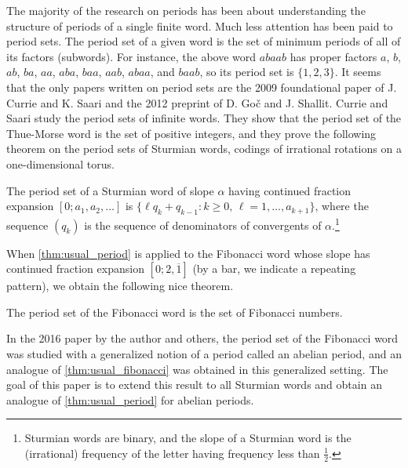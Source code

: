 \documentclass[a4paper,fleqn]{article}
\begin{document}
  The majority of the research on periods has been about understanding the structure of periods of a single finite
  word. Much less attention has been paid to period sets. The period set of a given word is the set of minimum periods
  of all of its factors (subwords). For instance, the above word $abaab$ has proper factors $a$, $b$, $ab$, $ba$, $aa$,
  $aba$, $baa$, $aab$, $abaa$, and $baab$, so its period set is $\{1, 2, 3\}$. It seems that the only papers written on
  period sets are the 2009 foundational paper \cite{2009:least_periods_of_factors_of_infinite_words} of J. Currie and
  K. Saari and the 2012 preprint \cite{2012:least_periods_of_k-automatic_sequences} of D. Go{\v c} and J. Shallit.
  Currie and Saari study the period sets of infinite words. They show that the period set of the Thue-Morse word
  \cite{1999:the_ubiquitous_prouhet-thue-morse_sequence} is the set of positive integers, and they prove the following
  theorem on the period sets of Sturmian words, codings of irrational rotations on a one-dimensional torus.

  \begin{theorem}\label{thm:usual_period}\cite[Cor.~3]{2009:least_periods_of_factors_of_infinite_words}
    The period set of a Sturmian word of slope $\alpha$ having continued fraction expansion $[0; a_1, a_2, \ldots]$ is
    $\{\ell q_k + q_{k-1} : \text{$k \geq 0$, $\ell = 1, \ldots, a_{k+1}$}\}$, where the sequence $(q_k)$ is the
    sequence of denominators of convergents of $\alpha$.\footnote{Sturmian words are binary, and the slope of a Sturmian word is the (irrational) frequency of the letter having frequency less than $\tfrac12$.}
  \end{theorem}

  When \autoref{thm:usual_period} is applied to the Fibonacci word whose slope has continued fraction expansion
  $[0; 2, \overline{1}]$ (by a bar, we indicate a repeating pattern), we obtain the following nice theorem.

  \begin{theorem}\label{thm:usual_fibonacci}\cite[Cor.~4]{2009:least_periods_of_factors_of_infinite_words}
    The period set of the Fibonacci word is the set of Fibonacci numbers.
  \end{theorem}

  In the 2016 paper \cite{2016:abelian_powers_and_repetitions_in_sturmian_words} by the author and others, the period
  set of the Fibonacci word was studied with a generalized notion of a period called an abelian period, and an analogue
  of \autoref{thm:usual_fibonacci} was obtained in this generalized setting. The goal of this paper is to extend this
  result to all Sturmian words and obtain an analogue of \autoref{thm:usual_period} for abelian periods.
\end{document}
